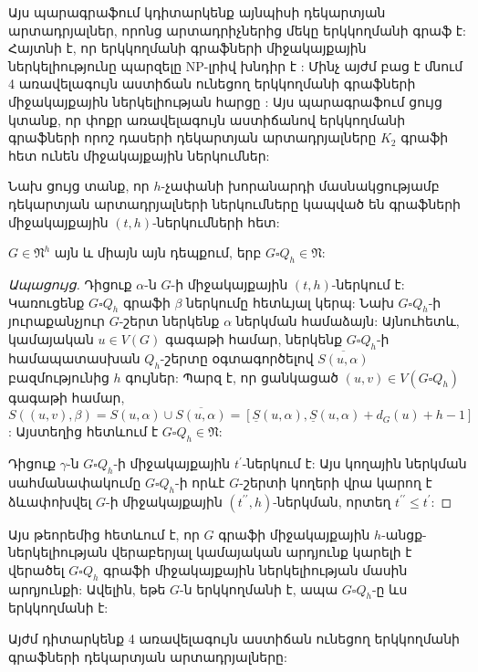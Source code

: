 Այս պարագրաֆում կդիտարկենք այնպիսի դեկարտյան արտադրյալներ, որոնց արտադրիչներից մեկը երկկողմանի գրաֆ է: Հայտնի է, որ երկկողմանի գրաֆների միջակայքային ներկելիությունը պարզելը NP-լրիվ խնդիր է \cite{Sevastyanov1990}: Մինչ այժմ բաց է մնում 4 առավելագույն աստիճան ունեցող երկկողմանի գրաֆների միջակայքային ներկելիության հարցը \cite{JensenToft1995,Stiebitz2012}: Այս պարագրաֆում ցույց կտանք, որ փոքր առավելագույն աստիճանով երկկողմանի գրաֆների որոշ դասերի դեկարտյան արտադրյալները $K_2$ գրաֆի հետ ունեն միջակայքային ներկումներ:

Նախ ցույց տանք, որ $h$-չափանի խորանարդի մասնակցությամբ դեկարտյան արտադրյալների ներկումները կապված են գրաֆների միջակայքային $(t,h)$-ներկումների հետ:

\begin{theorem}
\label{t2_cartesian_gap} $G\in \mathfrak{N}^{h}$ այն և միայն այն դեպքում, երբ $G\square
Q_{h}\in \mathfrak{N}$:
\end{theorem}
\begin{proof}[Ապացույց]
Դիցուք $\alpha$-ն $G$-ի միջակայքային $(t,h)$-ներկում է: Կառուցենք $G\square Q_{h}$ գրաֆի $\beta$ ներկումը հետևյալ կերպ: Նախ $G\square Q_{h}$-ի յուրաքանչյուր $G$-շերտ ներկենք $\alpha$ ներկման համաձայն: Այնուհետև, կամայական $u\in V(G)$ գագաթի համար, ներկենք $G\square Q_{h}$-ի համապատասխան $Q_{h}$-շերտը օգտագործելով $\overline
{S\left(u,\alpha \right)}$ բազմությունից $h$ գույներ: Պարզ է, որ ցանկացած $(u,v)\in V(G\square
Q_{h})$ գագաթի համար, $S\left((u,v),\beta \right)=S\left(u,\alpha \right)\cup
\overline{S\left(u,\alpha \right)}=\left[\underline S\left(u,\alpha
\right),\underline S\left(u,\alpha \right)+d_{G}(u)+h-1\right]$:
Այստեղից հետևում է $G\square Q_{h}\in \mathfrak{N}$:

Դիցուք $\gamma$-ն $G\square
Q_{h}$-ի միջակայքային $t^{\prime}$-ներկում է: Այս կողային ներկման սահմանափակումը $G\square Q_{h}$-ի որևէ $G$-շերտի կողերի վրա կարող է ձևափոխվել $G$-ի
միջակայքային $(t^{\prime\prime},h)$-ներկման, որտեղ $t^{\prime\prime}\leq
t^{\prime}$:
\end{proof} %

Այս թեորեմից հետևում է, որ $G$ գրաֆի միջակայքային $h$-անցք-ներկելիության վերաբերյալ կամայական արդյունք կարելի է վերածել $G\square Q_{h}$ գրաֆի միջակայքային ներկելիության մասին արդյունքի: Ավելին, եթե $G$-ն երկկողմանի է, ապա $G\square Q_{h}$-ը ևս երկկողմանի է:

Այժմ դիտարկենք 4 առավելագույն աստիճան ունեցող երկկողմանի գրաֆների դեկարտյան արտադրյալները:

